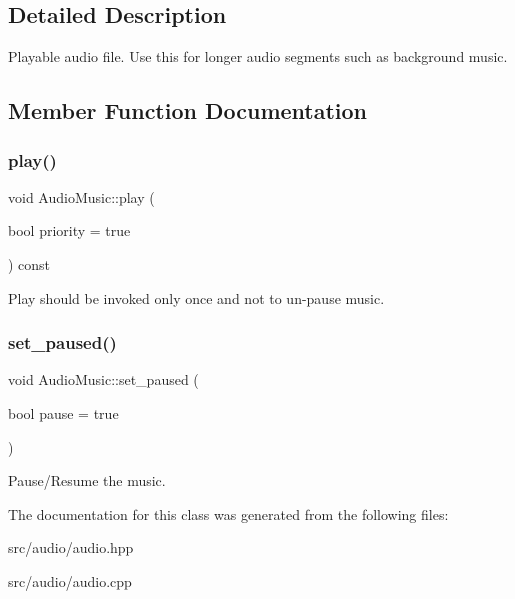 \subsection{Detailed Description}
Playable audio file. Use this for longer audio segments such as background music. 

\subsection{Member Function Documentation}
\mbox{\label{class_audio_music_a9867971e26b4d081936287af1923fd1a}} 
\subsubsection{\texorpdfstring{play()}{play()}}
{\footnotesize\ttfamily void Audio\+Music\+::play (\begin{DoxyParamCaption}\item[{bool}]{priority = {\ttfamily true} }\end{DoxyParamCaption}) const}

Play should be invoked only once and not to un-\/pause music. \mbox{\label{class_audio_music_a5de1c2fc9f565af444c48b85b56d7c8f}} 
\subsubsection{\texorpdfstring{set\+\_\+paused()}{set\_paused()}}
{\footnotesize\ttfamily void Audio\+Music\+::set\+\_\+paused (\begin{DoxyParamCaption}\item[{bool}]{pause = {\ttfamily true} }\end{DoxyParamCaption})}

Pause/\+Resume the music. 

The documentation for this class was generated from the following files\+:\begin{DoxyCompactItemize}
\item 
src/audio/audio.\+hpp\item 
src/audio/audio.\+cpp\end{DoxyCompactItemize}
